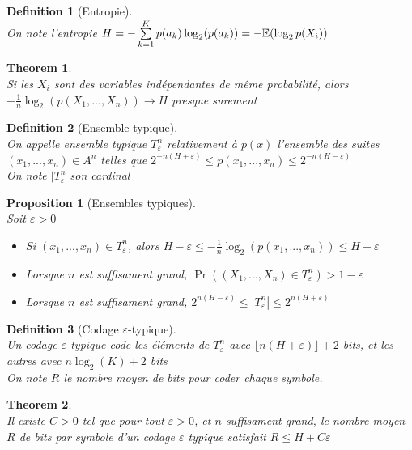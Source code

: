 \documentclass[a4paper]{article}
\newtheorem*{prop}{Proposition}
\newtheorem*{definition}{Definition}
\newtheorem*{theorem}{Theorem}
\newcommand{\E}{\ensuremath\mathbb{E}}
\renewcommand{\leq}{\leqslant}
\renewcommand{\(}{\left(}
\renewcommand{\)}{\right)}
\newcommand{\ra}{\rightarrow}
\begin{document}
\begin{definition}[Entropie]~\\
  On note l'entropie $H = -\sum\limits_{k=1}^{K}p(a_k)\log_2(p(a_k)) = -\E(\log_2p(X_i))$
\end{definition}

\begin{theorem}~\\
  Si les $X_i$ sont des variables indépendantes de même probabilité, alors\\
  $-\frac{1}{n}\log_2\(p(X_1,...,X_n)\) \ra H$ presque surement
\end{theorem}

\begin{definition}[Ensemble typique]~\\
  On appelle ensemble typique $T_{\varepsilon}^n$ relativement à $p(x)$
  l'ensemble des suites $(x_1,...,x_n) \in A^n$ telles que
  $2^{-n(H+\varepsilon)} \leq p(x_1,...,x_n) \leq 2^{-n(H-\varepsilon)}$\\
  On note $|T_{\varepsilon}^n$ son cardinal
\end{definition}

\begin{prop}[Ensembles typiques]~\\
  Soit $\varepsilon >0$
  \begin{itemize}
  \item[-] Si $(x_1,...,x_n) \in T_{\varepsilon}^n$, $
    $alors $H-\varepsilon \leq -\frac{1}{n}\log_2\(p(x_1,...,x_n)\) \leq
    H+\varepsilon$
  \item[-] Lorsque $n$ est suffisament grand, $\Pr\((X_1,...,X_n)\in
    T_{\varepsilon}^n\) > 1-\varepsilon$
  \item[-] Lorsque $n$ est suffisament grand,
    $2^{n(H-\varepsilon)} \leq |T_{\varepsilon}^n| \leq 2^{n(H+\varepsilon)}$
  \end{itemize}
\end{prop}

\begin{definition}[Codage $\varepsilon$-typique]~\\
  Un codage $\varepsilon$-typique code les éléments de $T_{\varepsilon}^n$ avec
  $\lfloor n(H+\varepsilon) \rfloor + 2$ bits, et les autres avec $n\log_2(K) +
  2$ bits\\
  On note $R$ le nombre moyen de bits pour coder chaque symbole.
\end{definition}

\begin{theorem}~\\
  Il existe $C > 0$ tel que pour tout $\varepsilon >0$, et $n$ suffisament
  grand, le nombre moyen $R$ de bits par symbole d'un codage $\varepsilon$
  typique satisfait $R \leq H + C\varepsilon$
\end{theorem}
\end{document}
